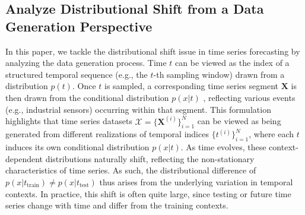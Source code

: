 \documentclass[sigconf,anonymous,review]{acmart}
\begin{document}


\subsection{Analyze Distributional Shift from a Data Generation Perspective}

In this paper, we tackle the distributional shift issue in time series forecasting by analyzing the data generation process.
Time $t$ can be viewed as the index of a structured temporal sequence (e.g., the $t$-th sampling window) drawn from a distribution $p(t)$.
Once $t$ is sampled, a corresponding time series segment $\mathbf{X}$ is then drawn from the conditional distribution $p(x | t)$ \citep{adak1998time-dependent}, reflecting various events (e.g., industrial sensors) occurring within that segment.
This formulation highlights that time series datasets $ \mathcal{X} = \{\mathbf{X}^{(i)}\}_{i=1}^N $ can be viewed as being generated from different realizations of temporal indices  $\{t^{(i)}\}_{i=1}^N$, where each $t$ induces its own conditional distribution $p(x | t)$.
As time evolves, these context-dependent distributions naturally shift, reflecting the non-stationary characteristics of time series.
As such, the distributional difference of $p(x| t_{\text{train}}) \ne p(x | t_{\text{test}})$ thus arises from the underlying variation in temporal contexts.
In practice, this shift is often quite large, since testing or future time series change with time and differ from the training contexts.
\end{document}
